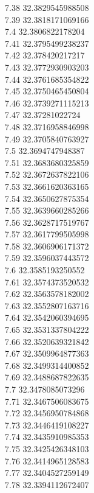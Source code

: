{7.38	32.3829545988508\\
7.39	32.3818171069166\\
7.4	32.3806822178204\\
7.41	32.3795499238237\\
7.42	32.378420217217\\
7.43	32.3772930903203\\
7.44	32.3761685354822\\
7.45	32.3750465450804\\
7.46	32.3739271115213\\
7.47	32.37281022724\\
7.48	32.3716958846998\\
7.49	32.3705840763927\\
7.5	32.3694747948387\\
7.51	32.3683680325859\\
7.52	32.3672637822106\\
7.53	32.3661620363165\\
7.54	32.3650627875354\\
7.55	32.3639660285266\\
7.56	32.3628717519767\\
7.57	32.3617799505998\\
7.58	32.3606906171372\\
7.59	32.3596037443572\\
7.6	32.3585193250552\\
7.61	32.3574373520532\\
7.62	32.3563578182002\\
7.63	32.3552807163716\\
7.64	32.3542060394695\\
7.65	32.3531337804222\\
7.66	32.3520639321842\\
7.67	32.3509964877363\\
7.68	32.3499314400852\\
7.69	32.3488687822635\\
7.7	32.3478085073296\\
7.71	32.3467506083675\\
7.72	32.3456950784868\\
7.73	32.3446419108227\\
7.74	32.3435910985353\\
7.75	32.3425426348103\\
7.76	32.3414965128583\\
7.77	32.3404527259149\\
7.78	32.3394112672407\\
}
